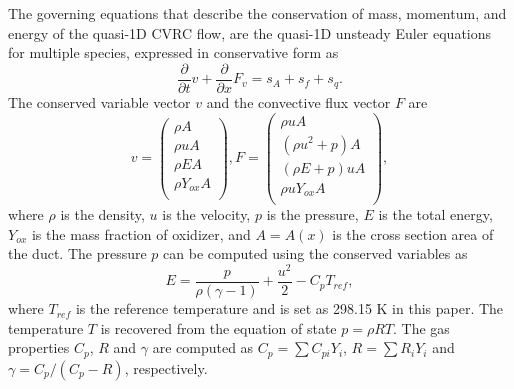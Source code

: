 The governing equations that describe the conservation of mass, momentum, and energy of the quasi-1D CVRC flow, are the quasi-1D unsteady Euler equations for multiple species, expressed in conservative form as
\begin{equation}\label{eq:5p2.1}
\frac{\partial }{\partial t} v + \frac{\partial }{\partial x} F_v = s_A + s_f + s_q.
\end{equation}
The conserved variable vector $v$ and the convective flux vector $F$ are
\begin{equation}\label{eq:5p2.2}
v= \left( \begin{gathered}
\rho A  \\
\rho uA  \\
\rho EA  \\
\rho Y_{ox} A \\
\end{gathered} \right), 
F = \left( \begin{gathered}
\rho uA  \\
\left(\rho u^2 + p\right)A  \\
\left(\rho E + p\right)uA  \\
\rho uY_{ox} A \\
\end{gathered} \right),
\end{equation}
where $\rho$ is the density, $u$ is the velocity, $p$ is the pressure, $E$ is the total energy, $Y_{ox}$ is the mass fraction of oxidizer, and $A=A(x)$ is the cross section area of the duct. The pressure $p$ can be computed using the conserved variables as
\begin{equation}\label{eq:total-engery}
E = \frac{p}{\rho (\gamma - 1)} + \frac{u^2}{2} - C_p T_{ref},
\end{equation}
where $T_{ref}$ is the reference temperature and is set as 298.15 K in this paper. The temperature $T$ is recovered from the equation of state $p = \rho R T$. The gas properties  $C_p$, $R$ and $\gamma$ are computed as $C_p= \sum C_{pi}Y_i$, $R=\sum R_iY_i$ and $ \gamma= C_p/(C_p-R)$, respectively. 


